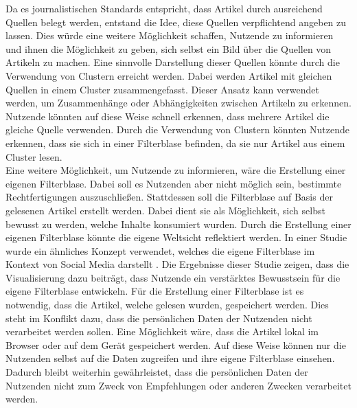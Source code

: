 Da es journalistischen Standards entspricht, dass Artikel durch ausreichend Quellen belegt werden, entstand die Idee, diese Quellen verpflichtend angeben zu lassen.
Dies würde eine weitere Möglichkeit schaffen, Nutzende zu informieren und ihnen die Möglichkeit zu geben, sich selbst ein Bild über die Quellen von Artikeln zu machen.
Eine sinnvolle Darstellung dieser Quellen könnte durch die Verwendung von Clustern erreicht werden.
Dabei werden Artikel mit gleichen Quellen in einem Cluster zusammengefasst.
Dieser Ansatz kann verwendet werden, um Zusammenhänge oder Abhängigkeiten zwischen Artikeln zu erkennen.
Nutzende könnten auf diese Weise schnell erkennen, dass mehrere Artikel die gleiche Quelle verwenden.
Durch die Verwendung von Clustern könnten Nutzende erkennen, dass sie sich in einer Filterblase befinden, da sie nur Artikel aus einem Cluster lesen. \\

Eine weitere Möglichkeit, um Nutzende zu informieren, wäre die Erstellung einer eigenen Filterblase.
Dabei soll es Nutzenden aber nicht möglich sein, bestimmte Rechtfertigungen auszuschließen.
Stattdessen soll die Filterblase auf Basis der gelesenen Artikel erstellt werden.
Dabei dient sie als Möglichkeit, sich selbst bewusst zu werden, welche Inhalte konsumiert wurden.
Durch die Erstellung einer eigenen Filterblase könnte die eigene Weltsicht reflektiert werden.
In einer Studie wurde ein ähnliches Konzept verwendet, welches die eigene Filterblase im Kontext von Social Media darstellt \cite{social-media-bubble}.
Die Ergebnisse dieser Studie zeigen, dass die Visualisierung dazu beiträgt, dass Nutzende ein verstärktes Bewusstsein für die eigene Filterblase entwickeln.
Für die Erstellung einer Filterblase ist es notwendig, dass die Artikel, welche gelesen wurden, gespeichert werden.
Dies steht im Konflikt dazu, dass die persönlichen Daten der Nutzenden nicht verarbeitet werden sollen.
Eine Möglichkeit wäre, dass die Artikel lokal im Browser oder auf dem Gerät gespeichert werden.
Auf diese Weise können nur die Nutzenden selbst auf die Daten zugreifen und ihre eigene Filterblase einsehen.
Dadurch bleibt weiterhin gewährleistet, dass die persönlichen Daten der Nutzenden nicht zum Zweck von Empfehlungen oder anderen Zwecken verarbeitet werden.\\
